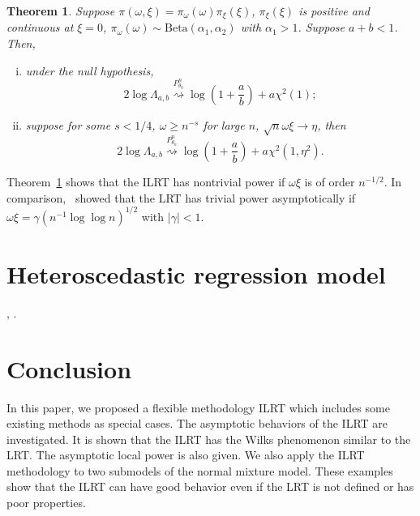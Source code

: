 \documentclass[11pt]{article}
\theoremstyle{plain}
\newtheorem{theorem}{\quad\quad Theorem}
\theoremstyle{definition}
\theoremstyle{remark}
\begin{document}
\begin{theorem}
    Suppose $\pi(\omega,\xi)=\pi_{\omega}(\omega) \pi_{\xi}(\xi)$, $\pi_\xi(\xi)$ is positive and continuous at $\xi=0$,
    $\pi_\omega(\omega)\sim \text{Beta}(\alpha_1,\alpha_2)$ with $\alpha_1>1$.
    Suppose $a+b<1$.
    Then,
    \begin{enumerate}[(i)]
        \item
    under the null hypothesis,
    \begin{equation*}
        2\log \Lambda_{a,b} \overset{P^n_{\theta_0}}{\rightsquigarrow}\log(1+\frac a b)+ a\chi^2(1);
    \end{equation*}
\item
    suppose for some $s<1/4$, $\omega \geq n^{-s}$ for large $n$, $\sqrt{n}\omega \xi \to \eta$, then
    \begin{equation*}
        2\log \Lambda_{a,b} \overset{P^n_{\theta_n}}{\rightsquigarrow}\log(1+\frac a b)+ a\chi^2(1,\eta^2).
    \end{equation*}
\end{enumerate}
    \label{mixtureThm}
\end{theorem}
Theorem~\ref{mixtureThm} shows that the ILRT has nontrivial power if $\omega \xi $ is of order $n^{-1/2}$. 
In comparison,~\cite{HALL2005158} showed that the LRT has  trivial power asymptotically if $\omega \xi=\gamma(n^{-1}\log \log n)^{1/2}$ with $|\gamma|< 1$.


\section{Heteroscedastic regression model}
\cite{Li2000},
\cite{Crisp1994}.



\section{Conclusion}
In this paper, we proposed a flexible methodology ILRT which includes some existing methods as special cases.
The asymptotic behaviors of the ILRT are investigated.
It is shown that the ILRT has the Wilks phenomenon similar to the LRT.
The asymptotic local power is also given.
We also apply the ILRT methodology to two submodels of the normal mixture model.
These examples show that the ILRT can have good behavior even if the LRT is not defined or has poor properties.
\end{document}
